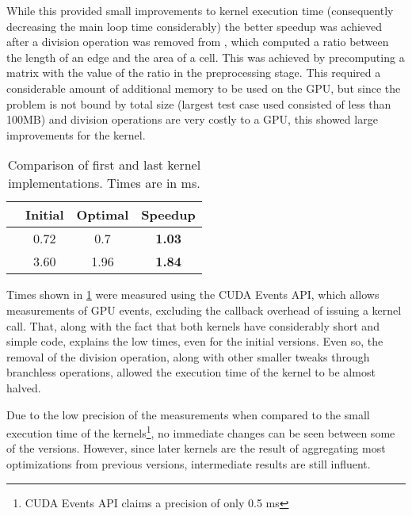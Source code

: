 While this provided small improvements to kernel execution time (consequently decreasing the main loop time considerably) the better speedup was achieved after a division operation was removed from \update, which computed a ratio between the length of an edge and the area of a cell.
This was achieved by precomputing a matrix with the value of the ratio in the preprocessing stage.
This required a considerable amount of additional memory to be used on the GPU, but since the problem is not bound by total size (largest test case used consisted of less than 100MB) and division operations are very costly to a GPU, this showed large improvements for the \update kernel.


\begin{table}
	\centering
	\begin{tabular}{r|cc|c}
						&	Initial	&	Optimal	&	Speedup	\\ \hline
		\computeflux	&	0.72	&	0.7		&	\textbf{1.03}	\\
		\update			&	3.60	&	1.96	&	\textbf{1.84}	\\ \hline
	\end{tabular}
	\caption{Comparison of first and last kernel implementations. Times are in ms.}
	\label{tab:kernel_speedups}
\end{table}

Times shown in \cref{tab:kernel_speedups} were measured using the CUDA Events API, which allows measurements of GPU events, excluding the callback overhead of issuing a kernel call. That, along with the fact that both kernels have considerably short and simple code, explains the low times, even for the initial versions.
Even so, the removal of the division operation, along with other smaller tweaks through branchless operations, allowed the execution time of the \update kernel to be almost halved.

Due to the low precision of the measurements when compared to the small execution time of the kernels\footnote{CUDA Events API claims a precision of only 0.5 ms}, no immediate changes can be seen between some of the versions. However, since later kernels are the result of aggregating most optimizations from previous versions, intermediate results are still influent.
